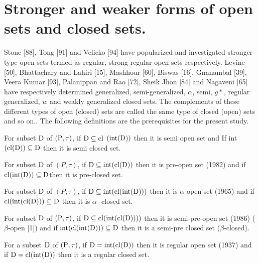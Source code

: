 \section{Stronger and weaker forms of open sets and closed sets.}

Stone [88], Tong [91] and Velicko [94] have popularized and investigated stronger type  open sets termed as regular, strong regular open sets respectively. Levine [50], Bhattachary and Lahiri [15], Mashhour [60], Biswas [16], Gnanambal [39], Veera Kumar [93], Palanippan and Rao [72], Sheik Jhon [84] and Nagaveni [65] have respectively determined generalized,  semi-generalized, $\alpha$, semi, $g*$, regular generalized, $w$ and weakly generalized closed sets. The complements of these different types of open (closed) sets are called the same type of closed (open) sets and so on..  The following definitions are the prerequisites for the present study.

\begin{dfn}\label{dfn1.2.1}
For subset $\mathrm{D}$ of $(\mathrm{P}, \tau)$, if $\mathrm{D} \subseteq \mathrm{cl}$ $(\mbox{int} (\mathrm{D}))$ then it is semi open set and 
If int $(\mathrm{cl}(\mathrm{D})) \subseteq \mathrm{D}$ then it is semi closed set.
\end{dfn}

\begin{dfn}\label{dfn1.2.2}
For subset $\mathrm{D}$ of $(P, \tau)$, if $\mathrm{D} \subseteq \mbox{int}(\mathrm{cl}(\mathrm{D}))$ then it is pre-open set (1982) and if $\mathrm{cl}(\mbox{int}(\mathrm{D})) \subseteq \mathrm{D}$then it is pre-closed set. 
\end{dfn}

\begin{dfn}\label{dfn1.2.3}
For subset $\mathrm{D}$ of $(P, \tau)$, if $\mathrm{D} \subseteq\mbox{int} (\mathrm{cl}(\mbox{int}(\mathrm{D})))$ then it is  $\alpha$-open set (1965)  and  if $\mathrm{cl}(\mbox{int}(\mathrm{cl}(\mathrm{D})))\subseteq \mathrm{D}$ then it is $\alpha$ -closed set. 
\end{dfn}

\begin{dfn}\label{dfn1.2.4}
For subset $\mathrm{D}$ of $(\mathrm{P}, \tau)$, if $\mathrm{D} \subseteq \mathrm{cl}(\mbox{int}(\mathrm{cl}(\mathrm{D}))))$ then it is semi-pre-open set (1986) ($\beta$-open [1]) and if $\mbox{int}(\mathrm{cl}(\mbox{int}(\mathrm{D}))) \subseteq \mathrm{D}$ then it is a semi-pre closed set ($\beta$-closed). 
\end{dfn}

\begin{dfn}\label{dfn1.2.5}
For a subset $\mathrm{D}$ of $(\mathrm{P}, \tau)$, if $\mathrm{D} = \mbox{int} (\mathrm{cl}(\mathrm{D}))$ then it is regular open set (1937) and if $\mathrm{D} = \mathrm{cl}(\mbox{int}(\mathrm{D}))$ then it is a regular closed set.  
\end{dfn}

